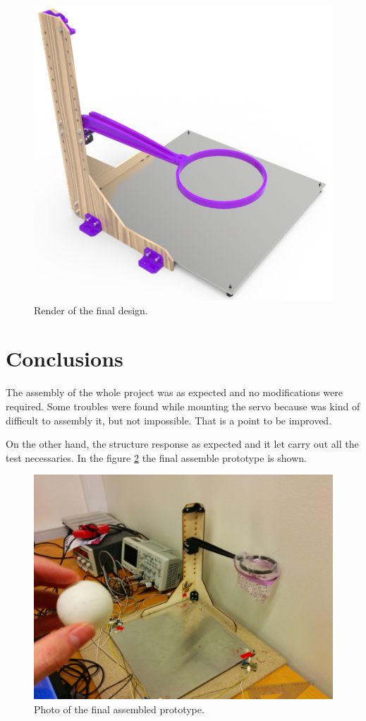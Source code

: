 		\begin{figure}[!hb]
			\begin{center}
				\includegraphics[width=.8\textwidth]{figures/render2}
			\end{center}
			\caption{Render of the final design.}
			\label{fig:render2}
		\end{figure}

	\section{Conclusions} %
	\label{sec:mechanics_conclusions}
		The assembly of the whole project was as expected and no modifications were required. Some troubles were found while mounting the servo because was kind of difficult to assembly it, but not impossible. That is a point to be improved.

		On the other hand, the structure response as expected and it let carry out all the test necessaries. In the figure \ref{fig:photo1} the final assemble prototype is shown.

		\begin{figure}[tb]
			\begin{center}
				\includegraphics[width=.8\textwidth]{figures/photo1}
			\end{center}
			\caption{Photo of the final assembled prototype.}
			\label{fig:photo1}
		\end{figure}
